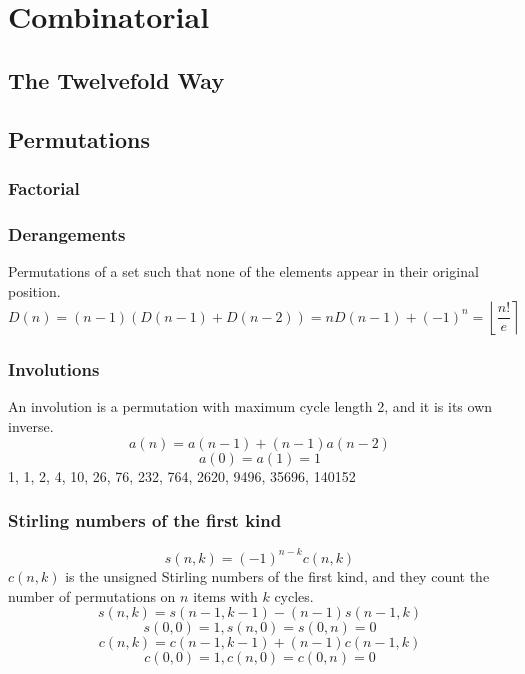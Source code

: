 
\chapter{Combinatorial}

	\section{The Twelvefold Way}
		
		
	\section{Permutations}
		\subsection{Factorial}
			
		
		\subsection{Derangements}
			Permutations of a set such that none of the elements appear in their original position.
			$$D(n) = (n-1)(D(n-1)+D(n-2)) = n D(n-1)+(-1)^n = \left\lfloor\frac{n!}{e}\right\rceil$$
		
		\subsection{Involutions}
			An involution is a permutation with maximum cycle length 2, and it is its own inverse.
			$$a(n) = a(n-1) + (n-1)a(n-2)$$
			$$a(0) = a(1) = 1$$
			1, 1, 2, 4, 10, 26, 76, 232, 764, 2620, 9496, 35696, 140152
		
		\subsection{Stirling numbers of the first kind}
			$$s(n,k) = (-1)^{n-k}c(n,k)$$
			$c(n,k)$ is the unsigned Stirling numbers of the first kind, and they count the number of permutations on $n$ items with $k$ cycles.
			$$s(n,k) = s(n-1,k-1) - (n-1) s(n-1,k)$$
			$$s(0,0) = 1, s(n,0) = s(0,n) = 0$$
			$$c(n,k) = c(n-1,k-1) + (n-1) c(n-1,k)$$
			$$c(0,0) = 1, c(n,0)=c(0,n)=0$$
		
